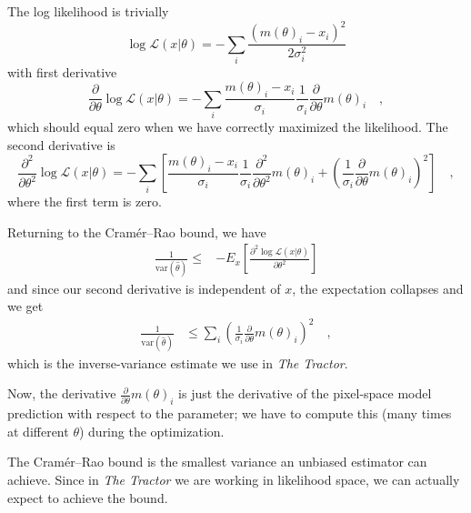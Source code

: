 \documentclass[letterpaper]{article}
\newcommand{\likelihood}{\mathcal{L}}
\newcommand{\dd}{\partial}
\newcommand{\var}{\textrm{var}}
\begin{document}
The log likelihood is trivially
\begin{equation}
\log \likelihood(x | \theta) = -\sum_i \frac{(m(\theta)_i - x_i)^2}{2 \sigma_i^2}
\end{equation}
with first derivative
\begin{equation}
\frac{\dd}{\dd \theta} \log \likelihood(x | \theta) = - \sum_i \frac{m(\theta)_i - x_i}{\sigma_i} \frac{1}{\sigma_i} \frac{\dd}{\dd \theta} m(\theta)_i
\quad ,
\end{equation}
which should equal zero when we have correctly maximized the likelihood.
The second derivative is
\begin{equation}
\frac{\dd^2}{\dd \theta^2} \log \likelihood(x | \theta) = - \sum_i \left[
  \frac{m(\theta)_i - x_i}{\sigma_i} \frac{1}{\sigma_i} \frac{\dd^2}{\dd \theta^2} m(\theta)_i
  + \left( \frac{1}{\sigma_i} \frac{\dd}{\dd \theta} m(\theta)_i \right)^2
\right]
\quad ,
\end{equation}
where the first term is zero.

Returning to the Cram\'er--Rao bound, we have
\begin{align}
\frac{1}{\var(\hat{\theta})} \le 
& - E_{x}\left[ \frac{\dd^2 \log \likelihood(x | \theta)}{\dd \theta^2} \right]
\end{align}
and since our second derivative is independent of $x$, the expectation
collapses and we get
\begin{align}
\frac{1}{\var(\hat{\theta})} & \le 
  \sum_i \left( \frac{1}{\sigma_i} \frac{\dd}{\dd \theta} m(\theta)_i \right)^2
  \quad ,
\end{align}
which is the inverse-variance estimate we use in \emph{The Tractor}.

Now, the derivative $\frac{\dd}{\dd \theta} m(\theta)_i$ is just the
derivative of the pixel-space model prediction with respect to the
parameter; we have to compute this (many times at different $\theta$)
during the optimization.

The Cram\'er--Rao bound is the smallest variance an unbiased estimator
can achieve.  Since in \emph{The Tractor} we are working in likelihood
space, we can actually expect to achieve the bound.





%
%
\end{document}
